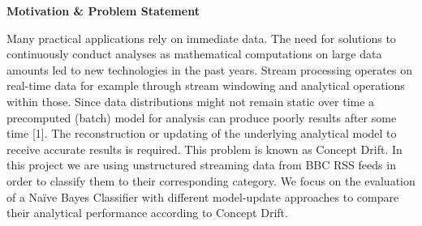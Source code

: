 \begin{center} \textbf{\huge Motivation \& Problem Statement} \end{center}
Many practical applications rely on immediate data. The need for solutions to continuously conduct analyses as mathematical computations on large data amounts led to new technologies in the past years. Stream processing operates on real-time data for example through stream windowing and analytical operations within those. Since data distributions might not remain static over time a precomputed (batch) model for analysis can produce poorly results after some time [1]. The reconstruction or updating of the underlying analytical model to receive accurate results is required. This problem is known as Concept Drift. In this project we are using unstructured streaming data from BBC RSS feeds in order to classify them to their corresponding category. We focus on the evaluation of a Na\"ive Bayes Classifier with different model-update approaches to compare their analytical performance according to Concept Drift. 
